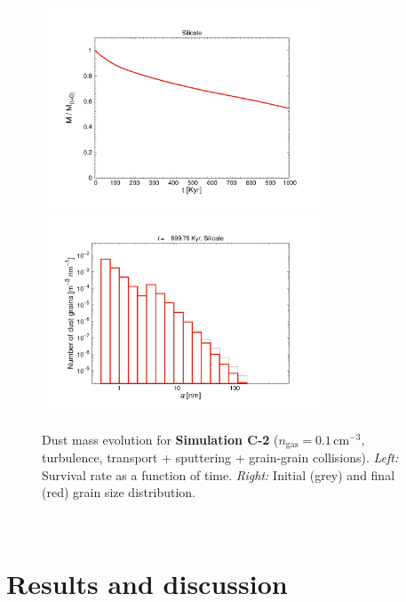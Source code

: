 \documentclass[fleqn,usenatbib]{mnras}
\begin{document}
      \begin{figure}
 \includegraphics[trim=2.5cm 1.5cm 2.2cm 2.3cm, clip=true,page=1,height = 6cm]{Pics/Pics_C2/Evolution_total.pdf}\hspace*{-0.1cm}
 \includegraphics[trim=2.4cm 1.5cm 2.2cm 2.3cm, clip=true,page=1,height = 6cm]{Pics/Pics_C2/Particlenumbers_04000.pdf}\\
  \caption{Dust mass evolution for \textbf{Simulation C-2} ($n_\text{gas}=0.1\,\text{cm}^{-3}$, turbulence, transport + sputtering + grain-grain collisions). \textit{Left:} Survival rate as a function of time. \textit{Right:} Initial (grey) and final (red) grain size distribution.}
  \label{fig_C2_other}  
  \end{figure}  
 
\newpage~
\newpage~
\newpage~
\newpage
\section{Results and discussion}
\end{document}
